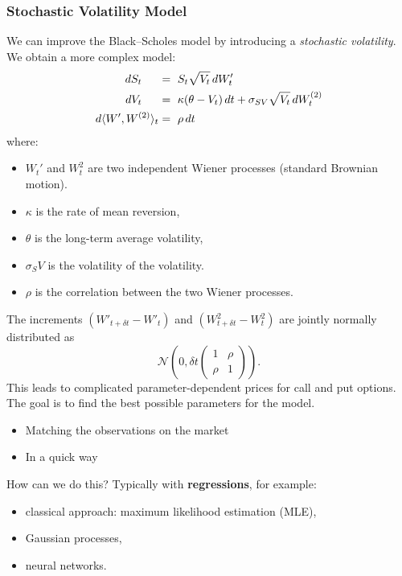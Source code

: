 \documentclass[11pt,a4paper]{article}
\theoremstyle{definition}
\theoremstyle{plain}
\theoremstyle{remark}
\begin{document}
\subsubsection{Stochastic Volatility Model}
We can improve the Black--Scholes model by introducing a \emph{stochastic volatility}.
We obtain a more complex model:
\begin{align}
    dS_t \hspace{1.5em} &=\ S_t \sqrt{V_t} \, dW_t' \nonumber \\
    dV_t \hspace{1.5em} &=\ \kappa (\theta - V_t) \, dt + \sigma_{SV} \sqrt{V_t} \, dW_t^{(2)} \nonumber \\
    d\langle W', W^{(2)} \rangle_t &=\ \rho \, dt
\end{align}
where:
\begin{itemize}
    \item $W_t'$ and $W_t^2$ are two independent Wiener processes (standard Brownian motion).
    \item $\kappa$ is the rate of mean reversion,
    \item $\theta$ is the long-term average volatility,
    \item $\sigma_SV$ is the volatility of the volatility.
    \item $\rho$ is the correlation between the two Wiener processes.
\end{itemize}

The increments $(W'_{t+\delta t} - W'_t)$ and $(W^2_{t+\delta t} - W^2_t)$ are jointly normally distributed as
\[
\mathcal{N}\left(
    0,
    \delta t \begin{pmatrix}
        1 & \rho \\
        \rho & 1
    \end{pmatrix}
\right).
\]
This leads to complicated parameter-dependent prices for call and put options.
The goal is to find the best possible parameters for the model.
\begin{itemize}
    \item Matching the observations on the market
    \item In a quick way
\end{itemize}

How can we do this?
Typically with \textbf{regressions}, for example:
\begin{itemize}
    \item classical approach: maximum likelihood estimation (MLE),
    \item Gaussian processes,
    \item neural networks.
\end{itemize}
\end{document}
